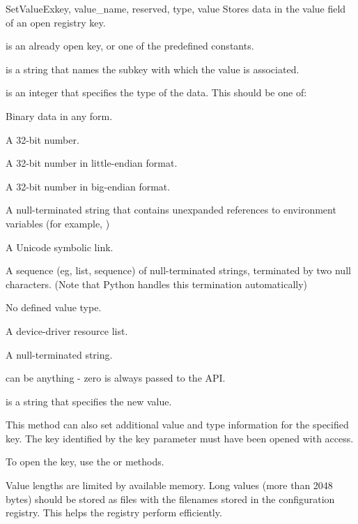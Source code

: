 \begin{funcdesc}{SetValueEx}{key, value_name, reserved, type, value}
  Stores data in the value field of an open registry key.
  
  is an already open key, or one of the predefined 
  constants.

  is a string that names the subkey with which the 
 value is associated.
 
  is an integer that specifies the type of the data.  
 This should be one of:
 \item[\constant{REG_BINARY}] 
 	Binary data in any form.
 \item[\constant{REG_DWORD}]
	A 32-bit number.
 \item[\constant{REG_DWORD_LITTLE_ENDIAN}]
 	A 32-bit number in little-endian format.
 \item[\constant{REG_DWORD_BIG_ENDIAN}]
	A 32-bit number in big-endian format.
 \item[\constant{REG_EXPAND_SZ}]
 	A null-terminated string that contains unexpanded references
	to environment variables (for example, )
 \item[\constant{REG_LINK}]
 	A Unicode symbolic link.
 \item[\constant{REG_MULTI_SZ}]
	A sequence (eg, list, sequence) of null-terminated strings, 
	terminated by two null characters. (Note that Python handles 
	this termination automatically)
 \item[\constant{REG_NONE}]
	No defined value type.
 \item[\constant{REG_RESOURCE_LIST}]
	A device-driver resource list.
 \item[\constant{REG_SZ}]
 	A null-terminated string.

  can be anything - zero is always passed to the 
 API.
 
  is a string that specifies the new value.

 This method can also set additional value and type information for the
 specified key.  The key identified by the key parameter must have been
 opened with  access.

 To open the key, use the  or 
  methods.

 Value lengths are limited by available memory. Long values (more than
 2048 bytes) should be stored as files with the filenames stored in
 the configuration registry.  This helps the registry perform efficiently.
\end{funcdesc}



